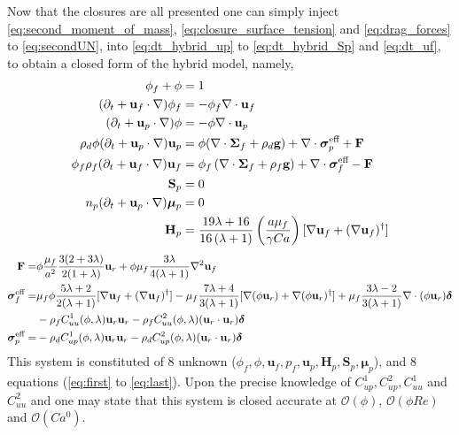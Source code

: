 Now that the closures are all presented one can simply inject \ref{eq:second_moment_of_mass}, \ref{eq:closure_surface_tension} and \ref{eq:drag_forces} to \ref{eq:secondUN}, into  \ref{eq:dt_hybrid_up} to \ref{eq:dt_hybrid_Sp} and \ref{eq:dt_uf}, to obtain a closed form of the hybrid model, namely,  
\begin{align}
    \label{eq:first}
    \phi_f + \phi &= 1\\
    (\pddt + \textbf{u}_f  \cdot \grad) \phi_f
    &= - \phi_f \div \textbf{u}_f\\
    (\pddt + \textbf{u}_p \cdot \grad)\phi
    &=
    - \phi \div \textbf{u}_p\\
    \rho_d \phi (\pddt + \textbf{u}_p \cdot \grad)\textbf{u}_p
    &=
    \phi(\div \bm\Sigma_f
    + \rho_d  \textbf{g})
    + \div \bm\sigma_p^\text{eff}
    + \textbf{F}
    \\
    \phi_f \rho_f(\pddt + \textbf{u}_f  \cdot \grad) \textbf{u}_f
    &= \phi_f 
    \left(\div \bm{\Sigma}_f
    + \rho_f \textbf{g}\right)
    + \div \bm\sigma_f^\text{eff}
    -\textbf{F}\\
    \textbf{S}_p &= 0\\
    n_p (\pddt + \textbf{u}_p \cdot \grad)\bm\mu_p &= 0\\
    \textbf{H}_p
    &=
    \frac{19 \lambda + 16}{16 \left(\lambda + 1\right)}
    \left(\frac{a \mu_f}{\gamma Ca}\right)[\grad \textbf{u}_f+  (\grad \textbf{u}_f)^\dagger]
    \label{eq:last}
\end{align}
\begin{align}
    \textbf{F}=&
    \phi
    \frac{\mu_f}{a^2}
    \frac{3(2+3\lambda)}{2(1+\lambda)}\textbf{u}_r
    + \phi\mu_f  \frac{3\lambda}{4(\lambda +1)} \grad^2 \textbf{u}_f\\
    \bm\sigma_f^\text{eff}
    =&
     \mu_f \phi \frac{5\lambda +2}{2(\lambda+1)} [\grad \textbf{u}_f+ (\grad \textbf{u}_f)^\dagger]
    - \mu_f \frac{7\lambda +4}{3(\lambda+1)} [
    \grad(\phi \textbf{u}_r)
    + \grad(\phi \textbf{u}_r)^\dagger]
    + \mu_f \frac{3\lambda - 2}{3(\lambda+1)} \div(\phi \textbf{u}_r)  \bm\delta\nonumber\\
    &-\rho_f C^1_{uu}(\phi,\lambda)  \textbf{u}_r \textbf{u}_r
    -\rho_f C^2_{uu} (\phi,\lambda) (\textbf{u}_r \cdot \textbf{u}_r)\bm\delta
    \label{eq:sigma_feffff}
    \\
    \bm\sigma_p^\text{eff}
    =&
    -\rho_d C^1_{up}(\phi,\lambda) \textbf{u}_r \textbf{u}_r
    -\rho_d C^2_{up}(\phi,\lambda) (\textbf{u}_r \cdot \textbf{u}_r)\bm\delta
\end{align}
This system is constituted of 8 unknown ($\phi_f,\phi,\textbf{u}_f,p_f,\textbf{u}_p,\textbf{H}_p,\textbf{S}_p,\bm\mu_p$), and 8 equations (\ref{eq:first} to \ref{eq:last}).  
Upon the precise knowledge of $C^1_{up}, C^2_{up}, C^1_{uu}$ and $C^2_{uu}$ and one may state that this system is closed accurate at $\mathcal{O}(\phi)$, $\mathcal{O}(\phi Re)$ and $\mathcal{O}(Ca^0)$. 

